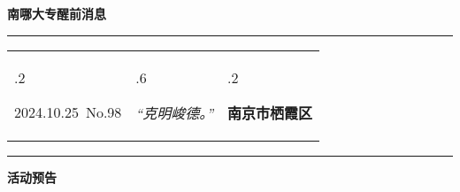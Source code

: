 \documentclass[letterpaper, 12pt]{article}
\begin{document}
\begin{center}
    \Huge\textbf{南哪大专醒前消息}
\end{center}
\vspace{4mm}
\hrule
\renewcommand\tabularxcolumn[1]{m{#1}}
\begin{tabularx}{\textwidth}{>{\hsize.2\hsize}X>{\hsize.6\hsize}X>{\hsize.2\hsize}X}
    \begin{flushleft}
        2024.10.25\, No.98
    \end{flushleft}
    &
    \begin{center}
        \textit{“克明峻德。”}
    \end{center}
    &
    \begin{flushright}
        \textbf{南京市栖霞区}
    \end{flushright}
\end{tabularx}
\vspace{-3.5mm}
\hrule
\vspace{4mm}
\centerline{\huge\textbf{活动预告}}
\end{document}
